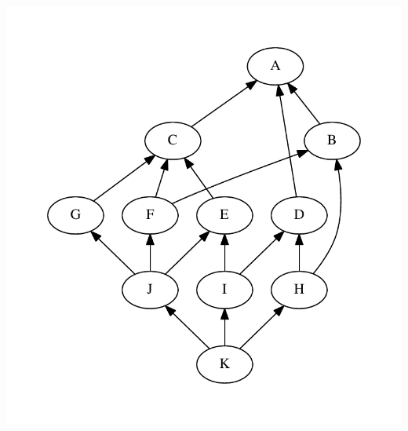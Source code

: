 \documentclass[11pt,oneside]{article}
\begin{document}
\begin{center}
\includegraphics[width=0.5\columnwidth]{subgroups_s4.pdf} 
\end{center}
\end{document}
